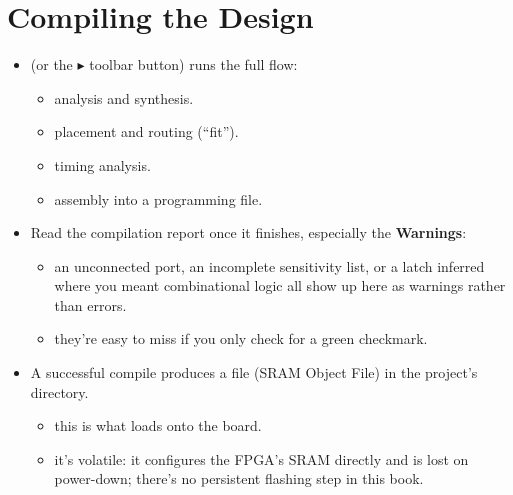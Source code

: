 \section{Compiling the Design}
\label{q:6}
\begin{itemize}
  \item {} (or the $\blacktriangleright$ toolbar button) runs the
    full flow:
  \begin{itemize}
    \item analysis and synthesis.
    \item placement and routing (``fit'').
    \item timing analysis.
    \item assembly into a programming file.
  \end{itemize}
  \item Read the compilation report once it finishes, especially the \textbf{Warnings}:
  \begin{itemize}
    \item an unconnected port, an incomplete sensitivity list, or a latch inferred where you meant
      combinational logic all show up here as warnings rather than errors.
    \item they're easy to miss if you only check for a green checkmark.
  \end{itemize}
  \item A successful compile produces a  file (SRAM Object File) in the project's
     directory.
  \begin{itemize}
    \item this is what  loads onto the board.
    \item it's volatile: it configures the FPGA's SRAM directly and is lost on power-down; there's
      no persistent flashing step in this book.
  \end{itemize}
\end{itemize}

